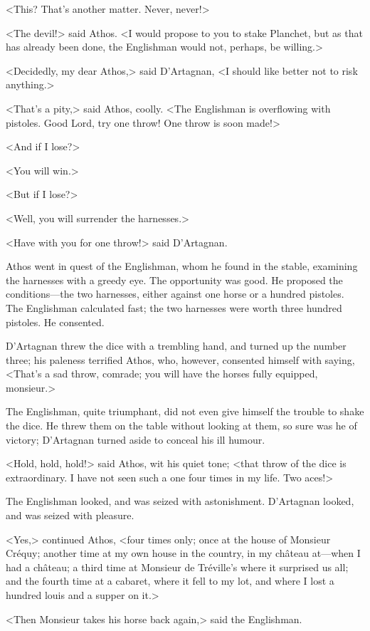 <This? That's another matter. Never, never!> 

<The devil!> said Athos. <I would propose to you to stake Planchet, but as that has already been done, the Englishman would not, perhaps, be willing.> 

<Decidedly, my dear Athos,> said D'Artagnan, <I should like better not to risk anything.> 

<That's a pity,> said Athos, coolly. <The Englishman is overflowing with pistoles. Good Lord, try one throw! One throw is soon made!> 

<And if I lose?> 

<You will win.> 

<But if I lose?> 

<Well, you will surrender the harnesses.> 

<Have with you for one throw!> said D'Artagnan. 

Athos went in quest of the Englishman, whom he found in the stable, examining the harnesses with a greedy eye. The opportunity was good. He proposed the conditions—the two harnesses, either against one horse or a hundred pistoles. The Englishman calculated fast; the two harnesses were worth three hundred pistoles. He consented. 

D'Artagnan threw the dice with a trembling hand, and turned up the number three; his paleness terrified Athos, who, however, consented himself with saying, <That's a sad throw, comrade; you will have the horses fully equipped, monsieur.> 

The Englishman, quite triumphant, did not even give himself the trouble to shake the dice. He threw them on the table without looking at them, so sure was he of victory; D'Artagnan turned aside to conceal his ill humour. 

<Hold, hold, hold!> said Athos, wit his quiet tone; <that throw of the dice is extraordinary. I have not seen such a one four times in my life. Two aces!> 

The Englishman looked, and was seized with astonishment. D'Artagnan looked, and was seized with pleasure. 

<Yes,> continued Athos, <four times only; once at the house of Monsieur Créquy; another time at my own house in the country, in my château at—when I had a château; a third time at Monsieur de Tréville's where it surprised us all; and the fourth time at a cabaret, where it fell to my lot, and where I lost a hundred louis and a supper on it.> 

<Then Monsieur takes his horse back again,> said the Englishman. 

